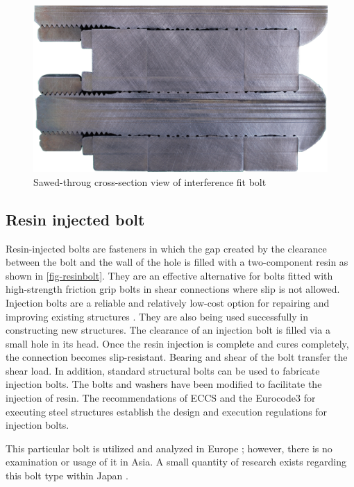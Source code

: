 \begin{figure}
    \centering
    \includegraphics[width=0.8\linewidth]{imgs/ch2/cs-b1.pdf}
    \caption{Sawed-throug cross-section view of interference fit bolt}
    \label{fig-cs-b1}
\end{figure}




\subsection{Resin injected bolt}

Resin-injected bolts are fasteners in which the gap created by the clearance between the bolt and the wall of the hole is filled with a two-component resin as shown in \ref{fig-resinbolt}. They are an effective alternative for bolts fitted with high-strength friction grip bolts in shear connections where slip is not allowed. Injection bolts are a reliable and relatively low-cost option for repairing and improving existing structures \cite{gresnigt1996injbolt}. They are also being used successfully in constructing new structures. The clearance of an injection bolt is filled via a small hole in its head. Once the resin injection is complete and cures completely, the connection becomes slip-resistant. Bearing and shear of the bolt transfer the shear load. In addition, standard structural bolts can be used to fabricate injection bolts. The bolts and washers have been modified to facilitate the injection of resin. The recommendations of ECCS and the Eurocode3 \cite{eurocode3,EN14399}for executing steel structures establish the design and execution regulations for injection bolts.

This particular bolt is utilized and analyzed in Europe \cite{pedrosa2022injbolt-mec,kolstein2017injbolt-mec,pedrosa2020injbolt-fati,pedrosa2021injbolt-fati,gresnigt2000injtbolt-use,ungermann2023injbolt-mec}; however, there is no examination or usage of it in Asia. A small quantity of research exists regarding this bolt type within Japan \cite{fujino2010resbolt,Ryota2018resbolt}.

